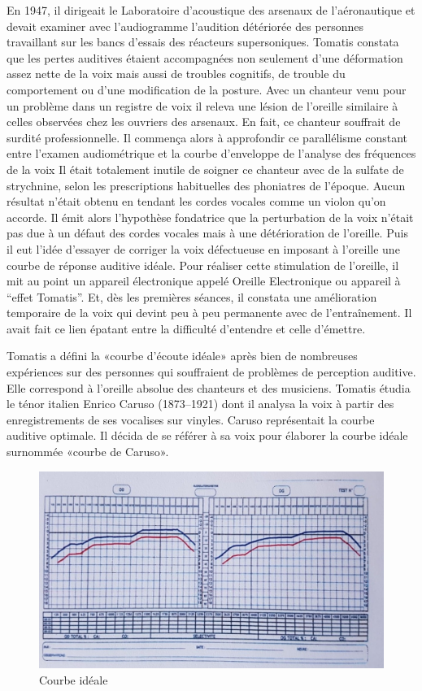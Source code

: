 En 1947, il dirigeait le Laboratoire d'acoustique
des arsenaux de l'aéronautique et devait examiner avec l'audiogramme l'audition détériorée
des personnes travaillant sur les bancs d'essais des réacteurs supersoniques. Tomatis constata que les pertes auditives étaient accompagnées non seulement  d'une
déformation assez nette de la voix mais aussi de troubles cognitifs, de trouble du comportement ou d'une modification de la posture. Avec
un chanteur venu pour un problème dans un registre de voix il releva une lésion de l'oreille similaire
à celles observées chez les ouvriers des arsenaux. En fait, ce chanteur
souffrait de surdité professionnelle. Il commença alors à approfondir
ce parallélisme constant entre l'examen audiométrique et la courbe
d'enveloppe de l'analyse des fréquences de la voix Il était totalement
inutile de soigner ce chanteur avec de la sulfate de
strychnine, selon les prescriptions habituelles des phoniatres de
l'époque. Aucun résultat n'était obtenu en tendant les cordes vocales
comme un violon qu'on accorde. Il émit alors l'hypothèse fondatrice
que la perturbation de la voix n'était pas due à un défaut des cordes
vocales mais à une détérioration de l'oreille. Puis il eut l'idée
d'essayer de corriger la voix défectueuse en imposant à l'oreille
une courbe de réponse auditive idéale. Pour réaliser cette stimulation
de l'oreille, il mit au point un appareil électronique appelé Oreille
Electronique ou appareil à ``effet Tomatis''. Et, dès les premières
séances, il constata une amélioration temporaire de la voix qui devint
peu à peu permanente avec de l'entraînement. Il avait fait ce lien épatant entre la difficulté d'entendre et celle d'émettre.

Tomatis a défini la «courbe d'écoute idéale» après
bien de nombreuses expériences sur des personnes qui souffraient de
problèmes de perception auditive. Elle correspond à l'oreille absolue
des chanteurs et des musiciens. Tomatis étudia le ténor italien Enrico
Caruso (1873--1921) dont il analysa la voix à partir des enregistrements
de ses vocalises sur vinyles. Caruso représentait la courbe auditive
optimale. Il décida de se référer à  sa voix pour élaborer la courbe idéale surnommée «courbe de Caruso».

\begin{figure}
	\centering
	\includegraphics[width=0.7\linewidth]{images/courbeideale.jpg}
	\caption{Courbe idéale}
	\label{fig:courbeideale}
\end{figure}



